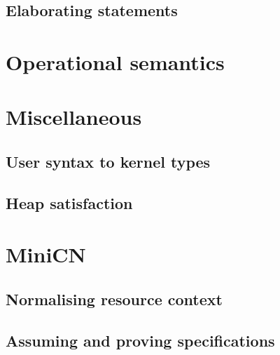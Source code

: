 \cndefnssimpXXres%

\subsection{Elaborating statements}
\cndefnselab%

\section{Operational semantics}

\cndefnssubsXXjudge%
\cndefnspureXXopsem%


\cndefnsopsem%

\section{Miscellaneous}

\cndefnsproofXXdefns%

\subsection{User syntax to kernel types}

\cndefnsuserXXdefns%

\subsection{Heap satisfaction}

\cndefnsheapXXsat%

\section{MiniCN}

\subsection{Normalising resource context}

\cndefnsminiXXres%

\subsection{Assuming and proving specifications}

